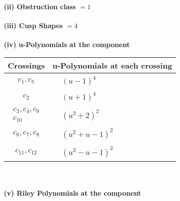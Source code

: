 \documentclass[1p]{elsarticle_modified}
\theoremstyle{definition}
\begin{document}
\flushleft \textbf{(ii) Obstruction class $= 1$}\\~\\
\flushleft \textbf{(iii) Cusp Shapes $= 4$}\\~\\
\newpage\renewcommand{\arraystretch}{1}
\flushleft \textbf{(iv) u-Polynomials at the component}\newline \\
\begin{tabular}{m{50pt}|m{274pt}}
Crossings & \hspace{64pt}u-Polynomials at each crossing \\
\hline $$\begin{aligned}c_{1},c_{5}\end{aligned}$$&$\begin{aligned}
&(u-1)^4
\end{aligned}$\\
\hline $$\begin{aligned}c_{2}\end{aligned}$$&$\begin{aligned}
&(u+1)^4
\end{aligned}$\\
\hline $$\begin{aligned}c_{3},c_{4},c_{9}\\c_{10}\end{aligned}$$&$\begin{aligned}
&(u^2+2)^2
\end{aligned}$\\
\hline $$\begin{aligned}c_{6},c_{7},c_{8}\end{aligned}$$&$\begin{aligned}
&(u^2+u-1)^2
\end{aligned}$\\
\hline $$\begin{aligned}c_{11},c_{12}\end{aligned}$$&$\begin{aligned}
&(u^2- u-1)^2
\end{aligned}$\\
\hline
\end{tabular}\\~\\
\newpage\renewcommand{\arraystretch}{1}
\flushleft \textbf{(v) Riley Polynomials at the component}\newline \\
\end{document}
